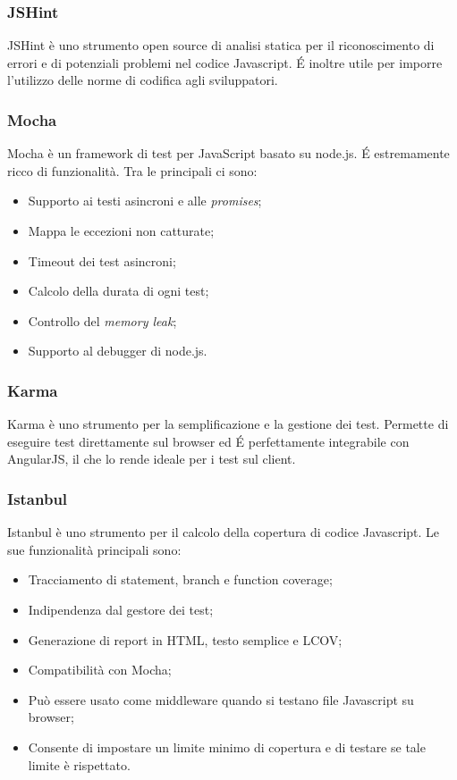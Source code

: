 \subsubsection{JSHint}
JSHint è uno strumento open source di analisi statica per il riconoscimento di errori e di potenziali problemi nel codice Javascript. \'E inoltre utile per imporre l'utilizzo delle norme di codifica agli sviluppatori.

\subsubsection{Mocha}
Mocha è un framework di test per  JavaScript basato su node.js. \'E estremamente ricco di funzionalità. Tra le principali ci sono:
\begin{itemize}
\item Supporto ai testi asincroni e alle \textit{promises};
\item Mappa le eccezioni non catturate;
\item Timeout dei test asincroni;
\item Calcolo della durata di ogni test;
\item Controllo del \textit{memory leak};
\item Supporto al debugger di node.js.
\end{itemize}

\subsubsection{Karma}
Karma è uno strumento per la semplificazione e la gestione dei test. Permette di eseguire test direttamente sul browser ed \'E perfettamente integrabile con AngularJS, il che lo rende ideale per i test sul client.


\subsubsection{Istanbul}
\label{Istabull}
Istanbul è uno strumento per il calcolo della copertura di codice Javascript. Le sue funzionalità principali sono:
\begin{itemize}
\item Tracciamento di statement, branch e function coverage;
\item Indipendenza dal gestore dei test;
\item Generazione di report in HTML, testo semplice e LCOV;
\item Compatibilità con Mocha;
\item Può essere usato come middleware quando si testano file Javascript su browser;
\item Consente di impostare un limite minimo di copertura e di testare se tale limite è rispettato.
\end{itemize}



